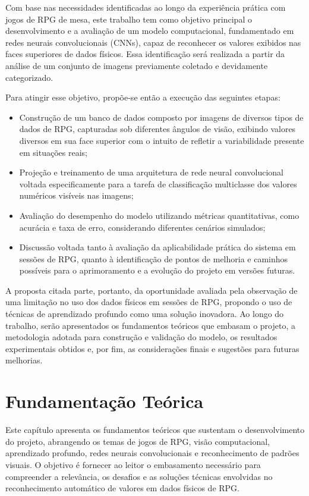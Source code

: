 Com base nas necessidades identificadas ao longo da experiência prática com jogos de RPG de mesa, este trabalho 
tem como objetivo principal o desenvolvimento e a avaliação de um modelo computacional, fundamentado em redes 
neurais convolucionais (CNNs), capaz de reconhecer os valores exibidos nas faces superiores de dados físicos. 
Essa identificação será realizada a partir da análise de um conjunto de imagens previamente coletado e 
devidamente categorizado.

Para atingir esse objetivo, propõe-se então a execução das seguintes etapas:

\begin{itemize}
\item Construção de um banco de dados composto por imagens de diversos tipos de dados de RPG, capturadas sob 
diferentes ângulos de visão, exibindo valores diversos em sua face superior com o intuito de refletir a 
variabilidade presente em situações reais;
\item Projeção e treinamento de uma arquitetura de rede neural convolucional voltada especificamente para a 
tarefa de classificação multiclasse dos valores numéricos visíveis nas imagens;
\item  Avaliação do desempenho do modelo utilizando métricas quantitativas, como acurácia e taxa de erro, 
considerando diferentes cenários simulados;
\item Discussão voltada tanto à avaliação da aplicabilidade prática do sistema em sessões de RPG, quanto à 
identificação de pontos de melhoria e caminhos possíveis para o aprimoramento e a evolução do projeto em 
versões futuras.
\end{itemize}

A proposta citada parte, portanto, da oportunidade avaliada pela observação de uma limitação no uso dos dados 
físicos em sessões de RPG, propondo o uso de técnicas de aprendizado profundo como uma solução inovadora. 
Ao longo do trabalho, serão apresentados os fundamentos teóricos que embasam o projeto, a metodologia adotada para 
construção e validação do modelo, os resultados experimentais obtidos e, por fim, as considerações finais e 
sugestões para futuras melhorias.


\section{Fundamentação Teórica}

Este capítulo apresenta os fundamentos teóricos que sustentam o desenvolvimento do projeto, abrangendo os temas 
de jogos de RPG, visão computacional, aprendizado profundo, redes neurais convolucionais e reconhecimento de 
padrões visuais. O objetivo é fornecer ao leitor o embasamento necessário para compreender a relevância, os 
desafios e as soluções técnicas envolvidas no reconhecimento automático de valores em dados físicos de RPG.


